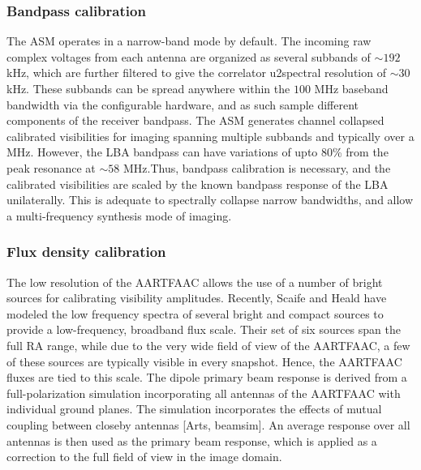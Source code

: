 \documentclass{aa}
\begin{document}


\subsubsection{Bandpass calibration}

The ASM  operates in  a narrow-band  mode by default.  The incoming  raw complex
voltages from each antenna are organized as several subbands of $\sim$$192$ kHz,
which  are further  filtered to  give  the correlator  u2spectral resolution  of
$\sim$$30$  kHz. These  subbands can  be spread  anywhere within  the  $100$ MHz
baseband bandwidth via  the configurable hardware, and as  such sample different
components  of  the  receiver  bandpass.  The ASM  generates  channel  collapsed
calibrated  visibilities for  imaging spanning  multiple subbands  and typically
over a MHz. However, the LBA bandpass  can have variations of upto 80\% from the
peak  resonance   at  $\sim$$58$  MHz\citep{vanhaarlem2013lofar}.Thus,  bandpass
calibration  is necessary,  and the  calibrated visibilities  are scaled  by the
known bandpass response of the  LBA unilaterally. This is adequate to spectrally
collapse  narrow  bandwidths, and  allow  a  multi-frequency  synthesis mode  of
imaging.


\subsubsection{Flux density calibration}

The low resolution of the AARTFAAC allows  the use of a number of bright sources
for    calibrating     visibility    amplitudes.     Recently,     Scaife    and
Heald\citep{scaife2012broad} have  modeled the low frequency  spectra of several
bright  and   compact  sources  to  provide  a   low-frequency,  broadband  flux
scale. Their set  of six sources span the  full RA range, while due  to the very
wide field of view of the AARTFAAC, a few of these sources are typically visible
in  every snapshot.   Hence, the  AARTFAAC fluxes  are tied  to this  scale. The
dipole  primary beam  response is  derived from  a  full-polarization simulation
incorporating all  antennas of the  AARTFAAC with individual ground  planes. The
simulation incorporates the effects  of mutual coupling between closeby antennas
{[}Arts, beamsim{]}. An  average response over all antennas is  then used as the
primary beam  response, which is  applied as a  correction to the full  field of
view in the image domain.
\end{document}
